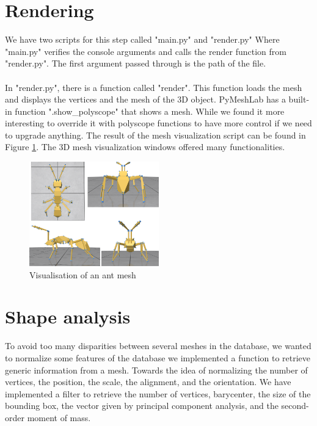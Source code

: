 \documentclass[10pt,twocolumn,letterpaper]{article}
\begin{document}
\section{Rendering}
We have two scripts for this step called "main.py" and "render.py" Where "main.py" verifies the console arguments and calls the render function from "render.py". The first argument passed through is the path of the file. \\ \\
In "render.py", there is a function called "render". This function loads the mesh and displays the vertices and the mesh of the 3D object. PyMeshLab has a built-in function ".show\_polyscope" that shows a mesh. While we found it more interesting to override it with polyscope functions to have more control if we need to upgrade anything. The result of the mesh visualization script can be found in Figure \ref{fig:ant-mesh}. The 3D mesh visualization windows offered many functionalities.

\begin{figure}[h!]
\begin{center}
  \includegraphics[width=0.5\textwidth]{picture/ant}
  \caption{Visualisation of an ant mesh}
  \label{fig:ant-mesh}
  \end{center}
\end{figure}

\section{Shape analysis}
To avoid too many disparities between several meshes in the database, we wanted to normalize some features of the database we implemented a function to retrieve generic information from a mesh. Towards the idea of normalizing the number of vertices, the position, the scale, the alignment, and the orientation. We have implemented a filter to retrieve the number of vertices, barycenter, the size of the bounding box, the vector given by principal component analysis, and the second-order moment of mass.
	
\end{document}
